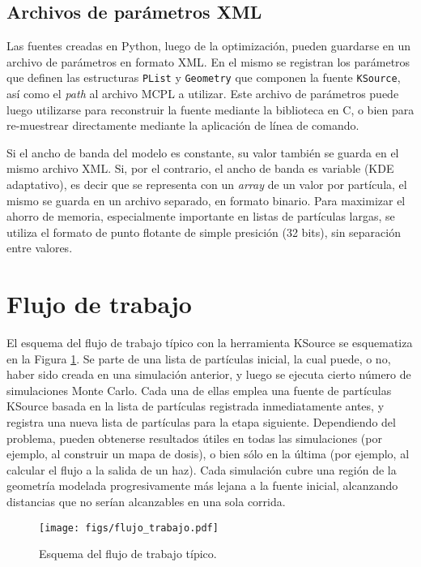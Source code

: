 \subsection{Archivos de parámetros XML}

Las fuentes creadas en Python, luego de la optimización, pueden guardarse en un archivo de parámetros en formato XML. En el mismo se registran los parámetros que definen las estructuras \verb|PList| y \verb|Geometry| que componen la fuente \verb|KSource|, así como el \emph{path} al archivo MCPL a utilizar. Este archivo de parámetros puede luego utilizarse para reconstruir la fuente mediante la biblioteca en C, o bien para re-muestrear directamente mediante la aplicación de línea de comando.

Si el ancho de banda del modelo es constante, su valor también se guarda en el mismo archivo XML. Si, por el contrario, el ancho de banda es variable (KDE adaptativo), es decir que se representa con un \emph{array} de un valor por partícula, el mismo se guarda en un archivo separado, en formato binario. Para maximizar el ahorro de memoria, especialmente importante en listas de partículas largas, se utiliza el formato de punto flotante de simple presición (32 bits), sin separación entre valores.


\section{Flujo de trabajo}
\label{sec:FT}

El esquema del flujo de trabajo típico con la herramienta KSource se esquematiza en la Figura \ref{fig:flujo}. Se parte de una lista de partículas inicial, la cual puede, o no, haber sido creada en una simulación anterior, y luego se ejecuta cierto número de simulaciones Monte Carlo. Cada una de ellas emplea una fuente de partículas KSource basada en la lista de partículas registrada inmediatamente antes, y registra una nueva lista de partículas para la etapa siguiente. Dependiendo del problema, pueden obtenerse resultados útiles en todas las simulaciones (por ejemplo, al construir un mapa de dosis), o bien sólo en la última (por ejemplo, al calcular el flujo a la salida de un haz). Cada simulación cubre una región de la geometría modelada progresivamente más lejana a la fuente inicial, alcanzando distancias que no serían alcanzables en una sola corrida.

\begin{figure}[b!]
	\centering
	\texttt{[image: figs/flujo\_trabajo.pdf]}
	\caption{Esquema del flujo de trabajo típico.}
	\label{fig:flujo}
\end{figure}

